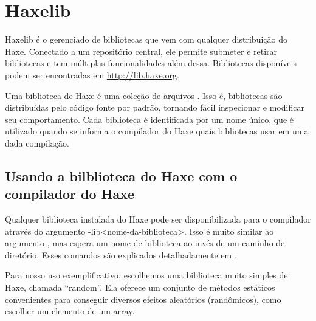\chapter{Haxelib}
\label{haxelib}

Haxelib é o gerenciado de bibliotecas que vem com qualquer distribuição do Haxe. Conectado a um repositório central, ele permite submeter e retirar bibliotecas e tem múltiplas funcionalidades além dessa. Bibliotecas disponíveis podem ser encontradas em \url{http://lib.haxe.org}.

Uma biblioteca de Haxe é uma coleção de arquivos . Isso é, bibliotecas são distribuídas pelo código fonte por padrão, tornando fácil inspecionar e modificar seu comportamento. Cada biblioteca é identificada por um nome único, que é utilizado quando se informa o compilador do Haxe quais bibliotecas usar em uma dada compilação.

\section{Usando a bilblioteca do Haxe com o compilador do Haxe}
\label{haxelib-using-haxe}

Qualquer biblioteca instalada do Haxe pode ser disponibilizada para o compilador através do argumento -lib<nome-da-biblioteca>. Isso é muito similar ao argumento , mas espera um nome de biblioteca ao invés de um caminho de diretório. Esses comandos são explicados detalhadamente em .

Para nosso uso exemplificativo, escolhemos uma biblioteca muito simples de Haxe, chamada ``random''. Ela oferece um conjunto de métodos estáticos convenientes para conseguir diversos efeitos aleatórios (randômicos), como escolher um elemento de um array.


